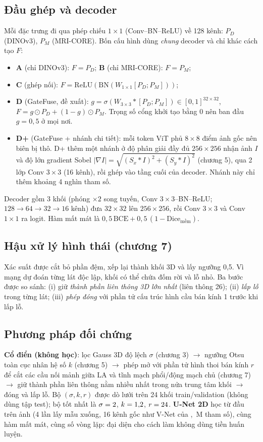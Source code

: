 \documentclass[11pt,a4paper]{article}
\begin{document}
\subsection{Đầu ghép và decoder}
Mỗi đặc trưng đi qua phép chiếu $1{\times}1$ (Conv--BN--ReLU) về 128 kênh: $P_D$ (DINOv3), $P_M$ (MRI-CORE). Bốn cấu hình dùng \emph{chung} decoder và chỉ khác cách tạo $F$:
\begin{itemize}
\item \textbf{A} (chỉ DINOv3): $F=P_D$; \quad \textbf{B} (chỉ MRI-CORE): $F=P_M$;
\item \textbf{C} (ghép nối): $F=\mathrm{ReLU}(\mathrm{BN}(W_{1\times1}[P_D;P_M]))$;
\item \textbf{D} (GateFuse, đề xuất): $g=\sigma(W_{3\times3}*[P_D;P_M])\in[0,1]^{32\times32}$, \; $F=g\odot P_D+(1-g)\odot P_M$. Trọng số cổng khởi tạo bằng 0 nên ban đầu $g=0{,}5$ ở mọi nơi.
\item \textbf{D+} (GateFuse + nhánh chi tiết): mỗi token ViT phủ $8\times8$ điểm ảnh gốc nên biên bị thô. D+ thêm một nhánh ở độ phân giải đầy đủ $256\times256$ nhận ảnh $I$ và độ lớn gradient Sobel $|\nabla I|=\sqrt{(S_x*I)^2+(S_y*I)^2}$ (chương 5), qua 2 lớp Conv $3{\times}3$ (16 kênh), rồi ghép vào tầng cuối của decoder. Nhánh này chỉ thêm khoảng 4 nghìn tham số.
\end{itemize}
Decoder gồm 3 khối (phóng $\times2$ song tuyến, Conv $3{\times}3$--BN--ReLU; $128\to64\to32\to16$ kênh) đưa $32\times32$ lên $256\times256$, rồi Conv $3{\times}3$ và Conv $1{\times}1$ ra logit. Hàm mất mát là $0{,}5\,\mathrm{BCE}+0{,}5\,(1-\mathrm{Dice}_{\text{mềm}})$.

\subsection{Hậu xử lý hình thái (chương 7)}
Xác suất được cắt bỏ phần đệm, xếp lại thành khối 3D và lấy ngưỡng 0,5. Vì mạng dự đoán từng lát độc lập, khối có thể chứa đốm rời và lỗ nhỏ. Ba bước được so sánh: (i) giữ \emph{thành phần liên thông 3D lớn nhất} (liên thông 26); (ii) \emph{lấp lỗ} trong từng lát; (iii) \emph{phép đóng} với phần tử cấu trúc hình cầu bán kính 1 trước khi lấp lỗ.

\subsection{Phương pháp đối chứng}
\textbf{Cổ điển (không học)}: lọc Gauss 3D độ lệch $\sigma$ (chương 3) $\to$ ngưỡng Otsu toàn cục nhân hệ số $k$ (chương 5) $\to$ phép mở với phần tử hình thoi bán kính $r$ để cắt các cầu nối mảnh giữa LA và tĩnh mạch phổi/động mạch chủ (chương 7) $\to$ giữ thành phần liên thông nằm nhiều nhất trong nửa trung tâm khối $\to$ đóng và lấp lỗ. Bộ $(\sigma,k,r)$ được dò lưới trên 24 khối train/validation (không dùng tập test); bộ tốt nhất là $\sigma=2$, $k=1{,}2$, $r=24$.
\textbf{U-Net 2D} \cite{unet} học từ đầu trên ảnh (4 lần lấy mẫu xuống, 16 kênh gốc như V-Net của \cite{uamt}, \ParamsUnet\,M tham số), cùng hàm mất mát, cùng số vòng lặp: đại diện cho cách làm không dùng tiền huấn luyện.
\end{document}

